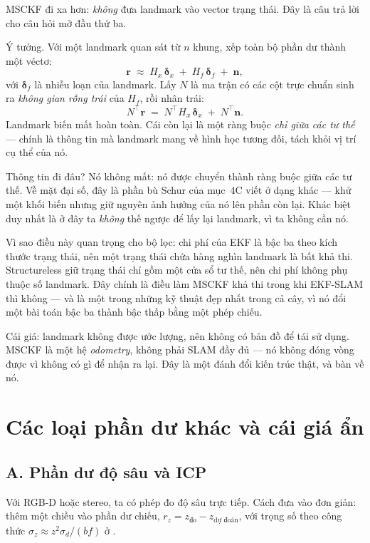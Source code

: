 \documentclass[../../vslam.tex]{subfiles}
\begin{document}
MSCKF \cite{mourikis2007msckf} đi xa hơn: \emph{không} đưa landmark vào vector trạng thái. Đây là câu trả lời cho câu hỏi mở đầu thứ ba.

Ý tưởng. Với một landmark quan sát từ \(n\) khung, xếp toàn bộ phần dư thành một véctơ:
\[
\mathbf{r} \;\approx\; H_x\,\boldsymbol{\delta}_x \;+\; H_f\,\boldsymbol{\delta}_f \;+\; \mathbf{n},
\]
với \(\boldsymbol{\delta}_f\) là nhiễu loạn của landmark. Lấy \(N\) là ma trận có các cột trực chuẩn sinh ra \emph{không gian rỗng trái} của \(H_f\), rồi nhân trái:
\[
N^{\top}\mathbf{r} \;=\; N^{\top}H_x\,\boldsymbol{\delta}_x \;+\; N^{\top}\mathbf{n}.
\]
Landmark biến mất hoàn toàn. Cái còn lại là một ràng buộc \emph{chỉ giữa các tư thế} --- chính là thông tin mà landmark mang về hình học tương đối, tách khỏi vị trí cụ thể của nó.

Thông tin đi đâu? Nó không mất: nó được chuyển thành ràng buộc giữa các tư thế. Về mặt đại số, đây là phần bù Schur của  mục~4C viết ở dạng khác --- khử một khối biến nhưng giữ nguyên ảnh hưởng của nó lên phần còn lại. Khác biệt duy nhất là ở đây ta \emph{không} thế ngược để lấy lại landmark, vì ta không cần nó.

Vì sao điều này quan trọng cho bộ lọc: chi phí của EKF là bậc ba theo kích thước trạng thái, nên một trạng thái chứa hàng nghìn landmark là bất khả thi. Structureless giữ trạng thái chỉ gồm một cửa sổ tư thế, nên chi phí không phụ thuộc số landmark. Đây chính là điều làm MSCKF khả thi trong khi EKF-SLAM thì không --- và là một trong những kỹ thuật đẹp nhất trong cả cây, vì nó đổi một bài toán bậc ba thành bậc thấp bằng một phép chiếu.

Cái giá: landmark không được ước lượng, nên không có bản đồ để tái sử dụng. MSCKF là một hệ \emph{odometry}, không phải SLAM đầy đủ --- nó không đóng vòng được vì không có gì để nhận ra lại. Đây là một đánh đổi kiến trúc thật, và  bàn về nó.

\section{Các loại phần dư khác và cái giá ẩn}

\subsection{A. Phần dư độ sâu và ICP}

Với RGB-D hoặc stereo, ta có phép đo độ sâu trực tiếp. Cách đưa vào đơn giản: thêm một chiều vào phần dư chiếu, \(r_z = z_{\text{đo}} - z_{\text{dự đoán}}\), với trọng số theo công thức \(\sigma_z \approx z^2\sigma_d/(bf)\) ở .
\end{document}
